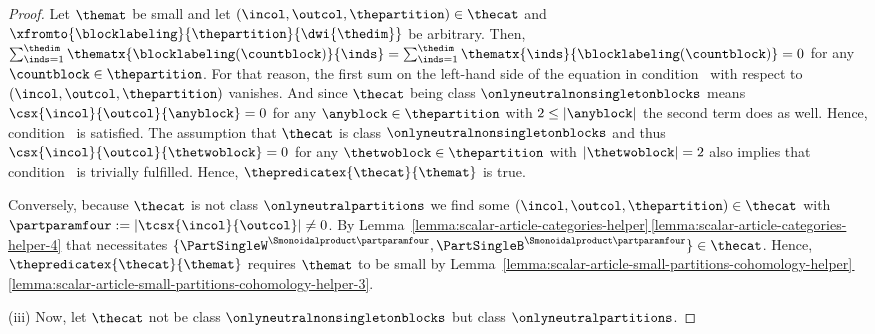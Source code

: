 \documentclass[pdftex]{sigma}
\numberwithin{equation}{section}
\begin{document}
{\begin{proof}
    Let $\themat$ be small and let $(\incol,\outcol,\thepartition)\in\thecat$ and $\xfromto{\blocklabeling}{\thepartition}{\dwi{\thedim}}$ be arbitrary. Then, $\sum_{\inds=1}^\thedim\thematx{\blocklabeling(\countblock)}{\inds}=\sum_{\inds=1}^\thedim\thematx{\inds}{\blocklabeling(\countblock)}=0$ for any $\countblock\in\thepartition$. For that reason, the first sum on the left-hand side of the equation in con\-di\-tion~\conditionone{} with respect to $(\incol,\outcol,\thepartition)$ vanishes. And since  $\thecat$ being class $\onlyneutralnonsingletonblocks$ means  $\csx{\incol}{\outcol}{\anyblock}=0$ for any $\anyblock\in\thepartition$ with $2\leq |\anyblock |$ the second term does as well. Hence,  con\-di\-tion~\conditionone{} is satisfied.  The assumption that $\thecat$ is class $\onlyneutralnonsingletonblocks$ and thus   $\csx{\incol}{\outcol}{\thetwoblock}=0$ for any $\thetwoblock\in\thepartition$ with $|\thetwoblock |=2$ also implies that con\-di\-tion~\conditiontwo{} is trivially fulfilled. Hence, $\thepredicatex{\thecat}{\themat}$ is true.

     Conversely, because $\thecat$ is not class $\onlyneutralpartitions$ we find some $(\incol,\outcol,\thepartition)\in\thecat$ with $\partparamfour:=|\tcsx{\incol}{\outcol}|\neq 0$. By
Lem\-ma~\hyperref[lemma:scalar-article-categories-helper-4]{\ref*{lemma:scalar-article-categories-helper}\,\ref*{lemma:scalar-article-categories-helper-4}} that necessitates $\{\PartSingleW^{\Smonoidalproduct \partparamfour},\PartSingleB^{\Smonoidalproduct \partparamfour}\}\in\thecat$.  Hence, $\thepredicatex{\thecat}{\themat}$ requires  $\themat$ to be  small by Lem\-ma~\hyperref[lemma:scalar-article-small-partitions-cohomology-helper-2]{\ref*{lemma:scalar-article-small-partitions-cohomology-helper}\,\ref*{lemma:scalar-article-small-partitions-cohomology-helper-3}}.

(iii)
Now, let $\thecat$ not be class $\onlyneutralnonsingletonblocks$ but class $\onlyneutralpartitions$.


\end{proof}}
\end{document}
